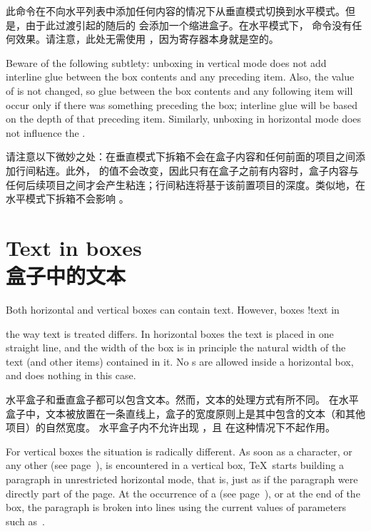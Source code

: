 此命令在不向水平列表中添加任何内容的情况下从垂直模式切换到水平模式。但是，由于此过渡引起的随后的  会添加一个缩进盒子。在水平模式下， 命令没有任何效果。请注意，此处无需使用 ，因为寄存器本身就是空的。


Beware of the following subtlety: unboxing in vertical
mode does not add interline glue between the box contents and
any preceding item. 
Also, the value of  is not
changed, so glue between the box contents and any following
item will  occur only if there was something preceding the box;
interline glue will be based on the depth of that preceding item.
Similarly, unboxing in horizontal mode does not influence
the .

请注意以下微妙之处：在垂直模式下拆箱不会在盒子内容和任何前面的项目之间添加行间粘连。此外， 的值不会改变，因此只有在盒子之前有内容时，盒子内容与任何后续项目之间才会产生粘连；行间粘连将基于该前置项目的深度。类似地，在水平模式下拆箱不会影响 。


\section{Text in boxes\\盒子中的文本}

Both horizontal and vertical boxes can contain text. However,
\term boxes !text in\par
the way text is treated differs. 
In horizontal boxes
the text is placed in one straight line, and the width of
the box is in principle the natural width of the text 
(and other items) contained in it. No s
are allowed inside a horizontal box, and  does
nothing in this case.

水平盒子和垂直盒子都可以包含文本。然而，文本的处理方式有所不同。
在水平盒子中，文本被放置在一条直线上，盒子的宽度原则上是其中包含的文本（和其他项目）的自然宽度。
水平盒子内不允许出现 ，且  在这种情况下不起作用。

For vertical boxes the situation is radically different.
As soon as a character, or any other 
(see page~\pageref{h:com:list}),
is encountered in a vertical box, \TeX\ starts building a paragraph
in unrestricted horizontal mode, that is, just as if the paragraph
were directly part of the page.
At the occurrence of a 
(see page~\pageref{v:com:list}), or at the end
of the box, the paragraph is broken into lines using the
current values of parameters such as~.

